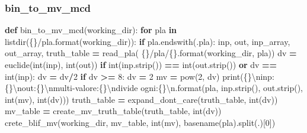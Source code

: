 \documentclass[
]{book}
\newenvironment{Shaded}{\begin{snugshade}}{\end{snugshade}}
\newcommand{\BuiltInTok}[1]{#1}
\newcommand{\CharTok}[1]{\textcolor[rgb]{0.31,0.60,0.02}{#1}}
\newcommand{\ControlFlowTok}[1]{\textcolor[rgb]{0.13,0.29,0.53}{\textbf{#1}}}
\newcommand{\DecValTok}[1]{\textcolor[rgb]{0.00,0.00,0.81}{#1}}
\newcommand{\KeywordTok}[1]{\textcolor[rgb]{0.13,0.29,0.53}{\textbf{#1}}}
\newcommand{\NormalTok}[1]{#1}
\newcommand{\OperatorTok}[1]{\textcolor[rgb]{0.81,0.36,0.00}{\textbf{#1}}}
\newcommand{\SpecialCharTok}[1]{\textcolor[rgb]{0.00,0.00,0.00}{#1}}
\newcommand{\StringTok}[1]{\textcolor[rgb]{0.31,0.60,0.02}{#1}}
\begin{document}
\newpage

\hypertarget{bin_to_mv_mcd}{%
\subsubsection{bin\_to\_mv\_mcd}\label{bin_to_mv_mcd}}

\begin{Shaded}
\begin{Highlighting}[]
\KeywordTok{def}\NormalTok{ bin\_to\_mv\_mcd(working\_dir):}
  \ControlFlowTok{for}\NormalTok{ pla }\KeywordTok{in}\NormalTok{ listdir(}\StringTok{\textquotesingle{}}\SpecialCharTok{\{\}}\StringTok{/pla\textquotesingle{}}\NormalTok{.}\BuiltInTok{format}\NormalTok{(working\_dir)):}
    \ControlFlowTok{if}\NormalTok{ pla.endswith(}\StringTok{\textquotesingle{}.pla\textquotesingle{}}\NormalTok{):}
\NormalTok{      inp, out, inp\_array, out\_array, truth\_table }\OperatorTok{=}\NormalTok{ read\_pla(}
        \StringTok{\textquotesingle{}}\SpecialCharTok{\{\}}\StringTok{/pla/}\SpecialCharTok{\{\}}\StringTok{\textquotesingle{}}\NormalTok{.}\BuiltInTok{format}\NormalTok{(working\_dir, pla))}
\NormalTok{      dv }\OperatorTok{=}\NormalTok{ euclide(}\BuiltInTok{int}\NormalTok{(inp), }\BuiltInTok{int}\NormalTok{(out))}
      \ControlFlowTok{if} \BuiltInTok{int}\NormalTok{(inp.strip()) }\OperatorTok{==} \BuiltInTok{int}\NormalTok{(out.strip()) }\KeywordTok{or}\NormalTok{ dv }\OperatorTok{==} \BuiltInTok{int}\NormalTok{(inp):}
\NormalTok{        dv }\OperatorTok{=}\NormalTok{ dv}\OperatorTok{/}\DecValTok{2}
      \ControlFlowTok{if}\NormalTok{ dv }\OperatorTok{\textgreater{}=} \DecValTok{8}\NormalTok{:}
\NormalTok{        dv }\OperatorTok{=} \DecValTok{2} 
\NormalTok{        mv }\OperatorTok{=} \BuiltInTok{pow}\NormalTok{(}\DecValTok{2}\NormalTok{, dv)}
        \BuiltInTok{print}\NormalTok{(}\StringTok{\textquotesingle{}}\SpecialCharTok{\{\}}\CharTok{\textbackslash{}n}\StringTok{inp: }\SpecialCharTok{\{\}}\CharTok{\textbackslash{}n}\StringTok{out:}\SpecialCharTok{\{\}}\CharTok{\textbackslash{}n}\StringTok{multi{-}valore:}\SpecialCharTok{\{\}}\CharTok{\textbackslash{}n}\StringTok{divide ogni:}\SpecialCharTok{\{\}}\CharTok{\textbackslash{}n}\StringTok{\textquotesingle{}}\NormalTok{.}\BuiltInTok{format}\NormalTok{(pla,}
\NormalTok{          inp.strip(), out.strip(), }\BuiltInTok{int}\NormalTok{(mv), }\BuiltInTok{int}\NormalTok{(dv)))}
\NormalTok{        truth\_table }\OperatorTok{=}\NormalTok{ expand\_dont\_care(truth\_table, }\BuiltInTok{int}\NormalTok{(dv))}
\NormalTok{        mv\_table }\OperatorTok{=}\NormalTok{ create\_mv\_truth\_table(truth\_table, }\BuiltInTok{int}\NormalTok{(dv))}
\NormalTok{        crete\_blif\_mv(working\_dir, mv\_table, }\BuiltInTok{int}\NormalTok{(mv),}
\NormalTok{          basename(pla).split(}\StringTok{\textquotesingle{}.\textquotesingle{}}\NormalTok{)[}\DecValTok{0}\NormalTok{])}
\end{Highlighting}
\end{Shaded}
\end{document}
